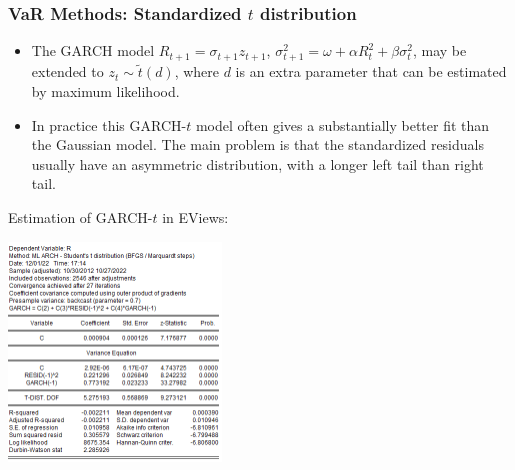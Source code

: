 \begin{frame}%

\frametitle{VaR Methods: Standardized $t$ distribution}

\begin{itemize}
\item The GARCH model $R_{t+1}=\sigma _{t+1}z_{t+1}$, $\sigma
_{t+1}^{2}=\omega +\alpha R_{t}^{2}+\beta \sigma _{t}^{2}$, may be extended
to $z_{t}\sim \tilde{t}(d)$, where $d$ is an extra parameter that can be
estimated by maximum likelihood.


\item In practice this GARCH-$t$ model often gives a substantially better
fit than the Gaussian model. The main problem is that the standardized
residuals usually have an asymmetric distribution, with a longer left tail
than right tail.
\end{itemize}

\end{frame}%

\begin{frame}%

\begin{block}{Estimation of GARCH-$t$ in EViews:}
\centerline{\includegraphics[height=2.3in]{Garcht}}
\end{block}

\end{frame}%

